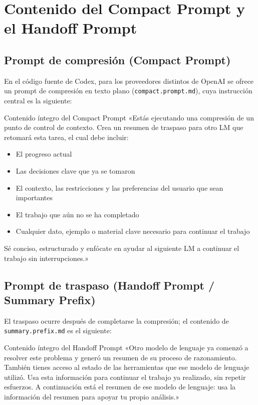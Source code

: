 \section{Contenido del Compact Prompt y el Handoff Prompt}

\subsection{Prompt de compresión (Compact Prompt)}

En el código fuente de Codex, para los proveedores distintos de OpenAI se ofrece un prompt de compresión en texto plano (\texttt{compact.prompt.md}), cuya instrucción central es la siguiente:

\begin{importantbox}{Contenido íntegro del Compact Prompt}
«Estás ejecutando una compresión de un punto de control de contexto. Crea un resumen de traspaso para otro LM que retomará esta tarea, el cual debe incluir:
\begin{itemize}
    \item El progreso actual
    \item Las decisiones clave que ya se tomaron
    \item El contexto, las restricciones y las preferencias del usuario que sean importantes
    \item El trabajo que aún no se ha completado
    \item Cualquier dato, ejemplo o material clave necesario para continuar el trabajo
\end{itemize}
Sé conciso, estructurado y enfócate en ayudar al siguiente LM a continuar el trabajo sin interrupciones.»
\end{importantbox}

\subsection{Prompt de traspaso (Handoff Prompt / Summary Prefix)}

El traspaso ocurre después de completarse la compresión; el contenido de \texttt{summary.prefix.md} es el siguiente:

\begin{importantbox}{Contenido íntegro del Handoff Prompt}
«Otro modelo de lenguaje ya comenzó a resolver este problema y generó un resumen de su proceso de razonamiento. También tienes acceso al estado de las herramientas que ese modelo de lenguaje utilizó. Usa esta información para continuar el trabajo ya realizado, sin repetir esfuerzos. A continuación está el resumen de ese modelo de lenguaje: usa la información del resumen para apoyar tu propio análisis.»
\end{importantbox}

